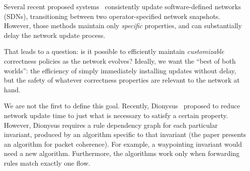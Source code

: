 Several recent proposed systems~\cite{Reitblatt2012,incremental-cu,zUpdate, Hong13}
consistently update software-defined networks (SDNs), 
transitioning between two operator-specified network snapshots. However, those
methods maintain only {\em specific} properties, 
and can substantially delay the network update process.

That leads to a question: is it possible to efficiently maintain
{\em customizable} correctness policies as
the network evolves?
Ideally, we want the ``best of both worlds'': the efficiency of simply immediately installing updates
without delay, but the safety of whatever correctness properties are relevant to the network at hand.

We are not the first to define this goal.
Recently, Dionysus~\cite{jin2014dynamic} proposed to reduce network update time to just what is
necessary to satisfy a certain property. However, Dionysus requires a
rule dependency graph for each particular invariant, produced by an algorithm
specific to that invariant (the paper presents an algorithm for packet
coherence). For example, a waypointing invariant would need a new algorithm.
Furthermore, the algorithms work only when forwarding rules match exactly one
flow.

